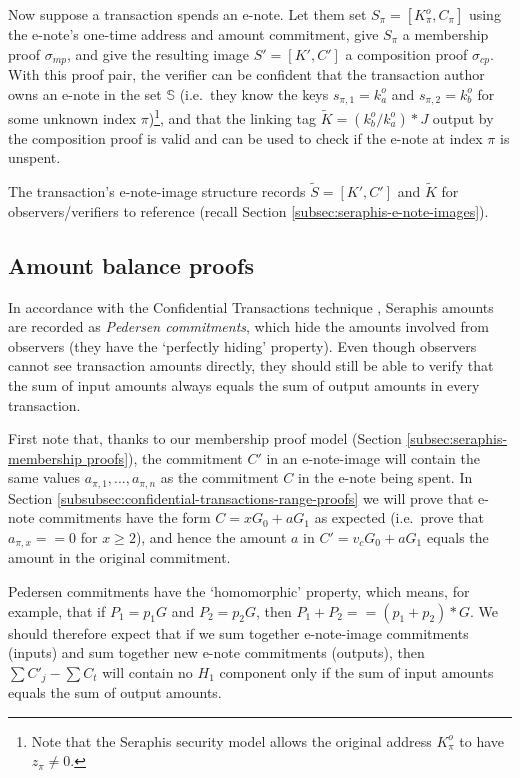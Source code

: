Now suppose a transaction spends an e-note. Let them set $S_{\pi} = [K^o_{\pi}, C_{\pi}]$ using the e-note's one-time address and amount commitment, give $S_{\pi}$ a membership proof $\sigma_{mp}$, and give the resulting image $S' = [K', C']$ a composition proof $\sigma_{cp}$. With this proof pair, the verifier can be confident that the transaction author owns an e-note in the set $\mathbb{S}$ (i.e.\ they know the keys $s_{\pi,1} = k^o_a$ and $s_{\pi,2} = k^o_b$ for some unknown index $\pi$)\footnote{Note that the Seraphis security model allows the original address $K^o_{\pi}$ to have $z_{\pi} \neq 0$.}, and that the linking tag $\tilde{K} = (k^o_b/k^o_a)*J$ output by the composition proof is valid and can be used to check if the e-note at index $\pi$ is unspent.

The transaction's e-note-image structure records $\tilde{S} = [K', C']$ and $\tilde{K}$ for observers/verifiers to reference (recall Section \ref{subsec:seraphis-e-note-images}).


\subsection{Amount balance proofs}
\label{subsec:seraphis-amount-balance-proofs}

In accordance with the Confidential Transactions technique \cite{maxwell-ct-2}, Seraphis amounts are recorded as {\em Pedersen commitments}, which hide the amounts involved from observers (they have the `perfectly hiding' property). Even though observers cannot see transaction amounts directly, they should still be able to verify that the sum of input amounts always equals the sum of output amounts in every transaction.

First note that, thanks to our membership proof model (Section \ref{subsec:seraphis-membership proofs}), the commitment $C'$ in an e-note-image will contain the same values $a_{\pi,1},...,a_{\pi,n}$ as the commitment $C$ in the e-note being spent. In Section \ref{subsubsec:confidential-transactions-range-proofs} we will prove that e-note commitments have the form $C = x G_0 + a G_1$ as expected (i.e.\ prove that $a_{\pi,x} == 0$ for $x \geq 2$), and hence the amount $a$ in $C' = v_c G_0 + a G_1$ equals the amount in the original commitment.

Pedersen commitments have the `homomorphic' property, which means, for example, that if $P_1 = p_1 G$ and $P_2 = p_2 G$, then $P_1 + P_2 == (p_1 + p_2)*G$. We should therefore expect that if we sum together e-note-image commitments (inputs) and sum together new e-note commitments (outputs), then $\sum C'_j - \sum C_t$ will contain no $H_1$ component only if the sum of input amounts equals the sum of output amounts.

